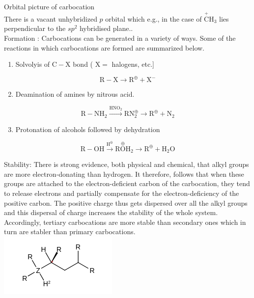 \documentclass[10pt]{article}
\begin{document}
Orbital picture of carbocation\\
There is a vacant unhybridized $p$ orbital which e.g., in the case of $\stackrel{+}{\mathrm{C}} \mathrm{H}_{3}$ lies perpendicular to the $s p^{2}$ hybridised plane..\\
Formation : Carbocations can be generated in a variety of ways. Some of the reactions in which carbocations are formed are summarized below.

\begin{enumerate}
  \item Solvolyis of $\mathrm{C}-\mathrm{X}$ bond ( $\mathrm{X}=$ halogens, etc.]
\end{enumerate}

$$
\mathrm{R}-\mathrm{X} \longrightarrow \mathrm{R}^{\oplus}+\mathrm{X}^{-}
$$

\begin{enumerate}
  \setcounter{enumi}{1}
  \item Deamination of amines by nitrous acid.
\end{enumerate}

$$
\mathrm{R}-\mathrm{NH}_{2} \xrightarrow{\mathrm{HNO}_{2}} \mathrm{RN}_{2}^{\oplus} \longrightarrow \mathrm{R}^{\oplus}+\mathrm{N}_{2}
$$

\begin{enumerate}
  \setcounter{enumi}{2}
  \item Protonation of alcohols followed by dehydration
\end{enumerate}

$$
\mathrm{R}-\mathrm{OH} \xrightarrow{\mathrm{H}^{\oplus}} \mathrm{R} \stackrel{\oplus}{\mathrm{O}} \mathrm{H}_{2} \longrightarrow \mathrm{R}^{\oplus}+\mathrm{H}_{2} \mathrm{O}
$$

Stability: There is strong evidence, both physical and chemical, that alkyl groups are more electron-donating than hydrogen. It therefore, follows that when these groups are attached to the electron-deficient carbon of the carbocation, they tend to release electrons and partially compensate for the electron-deficiency of the positive carbon. The positive charge thus gets dispersed over all the alkyl groups and this dispersal of charge increases the stability of the whole system. Accordingly, tertiary carbocations are more stable than secondary ones which in turn are stabler than primary carbocations.\\
\includegraphics{smile-70d344d3117f8d6dfa76f10fc38f58413ef26bc5}
\end{document}
